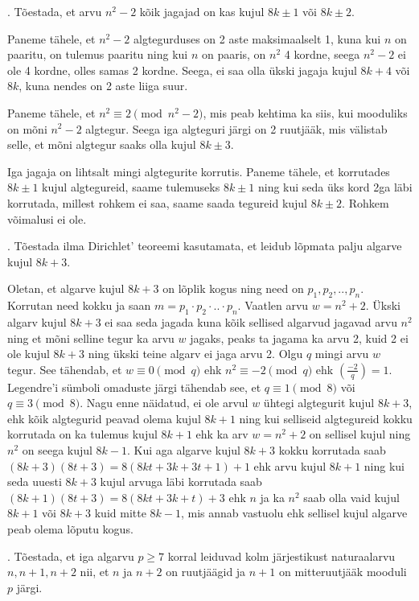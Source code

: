 \documentclass[a4paper, 10pt]{article}
\newcommand{\leg}[2]{\left(\frac{#1}{#2}\right)}
\begin{document}
. Tõestada, et arvu $n^2-2$ kõik jagajad on kas kujul $8k\pm1$ või $8k\pm2$. 

\bigskip
Paneme tähele, et $n^2-2$ algtegurduses on 2 aste maksimaalselt 1, kuna kui $n$ on paaritu, on tulemus paaritu ning kui $n$ on paaris, on $n^2$ 4 kordne, seega $n^2-2$ ei ole 4 kordne, olles samas 2 kordne. Seega, ei saa olla ükski jagaja kujul $8k+4$ või $8k$, kuna nendes on 2 aste liiga suur.

Paneme tähele, et $n^2\equiv2\pmod{n^2-2}$, mis peab kehtima ka siis, kui mooduliks on mõni $n^2-2$ algtegur. Seega iga algteguri järgi on 2 ruutjääk, mis välistab selle, et mõni algtegur saaks olla kujul $8k\pm3$.

Iga jagaja on lihtsalt mingi algtegurite korrutis. Paneme tähele, et korrutades $8k\pm1$ kujul algtegureid, saame tulemuseks $8k\pm1$ ning kui seda üks kord 2ga läbi korrutada, millest rohkem ei saa, saame saada tegureid kujul $8k\pm2$. Rohkem võimalusi ei ole. 

\bigskip
\pagebreak

. Tõestada ilma Dirichlet' teoreemi kasutamata, et leidub lõpmata palju algarve kujul $8k+3$. 

\bigskip
Oletan, et algarve kujul $8k+3$ on lõplik kogus ning need on $p_1,p_2,..,p_n$. Korrutan need kokku ja saan $m=p_1\cdot p_2\cdot..\cdot p_n$. Vaatlen arvu $w=n^2+2$. Ükski algarv kujul $8k+3$ ei saa seda jagada kuna kõik sellised algarvud jagavad arvu $n^2$ ning et mõni selline tegur ka arvu $w$ jagaks, peaks ta jagama ka arvu 2, kuid 2 ei ole kujul $8k+3$ ning ükski teine algarv ei jaga arvu 2. Olgu $q$ mingi arvu $w$ tegur. See tähendab, et $w\equiv0\pmod q$ ehk $n^2\equiv-2\pmod q$ ehk $\leg{-2}{q}=1$. Legendre'i sümboli omaduste järgi tähendab see, et $q\equiv1\pmod 8$ või $q\equiv3\pmod8$. Nagu enne näidatud, ei ole arvul $w$ ühtegi algtegurit kujul $8k+3$, ehk kõik algtegurid peavad olema kujul $8k+1$ ning kui selliseid algtegureid kokku korrutada on ka tulemus kujul $8k+1$ ehk ka arv $w=n^2+2$ on sellisel kujul ning $n^2$ on seega kujul $8k-1$. Kui aga algarve kujul $8k+3$ kokku korrutada saab $(8k+3)(8t+3)=8(8kt+3k+3t+1)+1$ ehk arvu kujul $8k+1$ ning kui seda uuesti $8k+3$ kujul arvuga läbi korrutada saab $(8k+1)(8t+3)=8(8kt+3k+t)+3$ ehk $n$ ja ka $n^2$ saab olla vaid kujul $8k+1$ või $8k+3$ kuid mitte $8k-1$, mis annab vastuolu ehk sellisel kujul algarve peab olema lõputu kogus.
\bigskip

. Tõestada, et iga algarvu $p\geq 7$ korral leiduvad kolm järjestikust naturaalarvu $n,n+1,n+2$ nii, et $n$ ja $n+2$ on ruutjäägid ja $n+1$ on mitteruutjääk mooduli $p$ järgi. 
\end{document}
